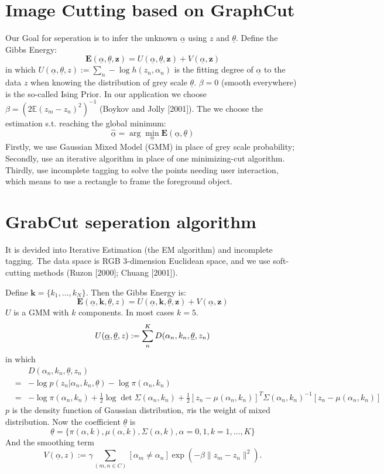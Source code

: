 \documentclass[a4paper, 11pt, nofonts, nocap, fancyhdr, hyperref, UTF8]{ctexart}
\begin{document}
\section{Image Cutting based on GraphCut}
Our Goal for seperation is to infer the unknown $\underline{\alpha}$ using $z$ and $\underline{\theta}$. Define the Gibbs Energy:
$$
\textbf{E}(\underline{\alpha},\underline{\theta},\textbf{z}) = U(\underline{\alpha},\underline{\theta},\textbf{z})+V(\underline{\alpha},\textbf{z})
$$
in which 
$U(\underline{\alpha},\underline{\theta},z) := \sum_n -\log h(z_n, \alpha_n)$
is the fitting degree of $\underline{\alpha}$ to the data $z$ when knowing the distribution of grey scale $\underline{\theta}$.
$\beta = 0$ (smooth everywhere) is the so-called Ising Prior. In our application we choose $\beta = (2\mathbb{E}(z_m-z_n)^2)^{-1}$ (Boykov and Jolly [2001]).
The we choose the estimation s.t. reaching the global minimum:
$$
\hat{\underline{\alpha}} = \arg \min \limits_{\underline{\alpha}} \textbf{E}(\underline{\alpha},\underline{\theta})
$$
Firstly, we use Gaussian Mixed Model (GMM) in place of grey scale probability; Secondly, use an iterative algorithm in place of one minimizing-cut algorithm. Thirdly, use incomplete tagging to solve the points needing user interaction, which means to use a rectangle to frame the foreground object.

\section{GrabCut seperation algorithm}
It is devided into Iterative Estimation (the EM algorithm) and incomplete tagging. The data space is RGB 3-dimension Euclidean space, and we use soft-cutting methods (Ruzon [2000]; Chuang [2001]).

Define $\textbf{k} = \{k_1,\ldots,k_N\}$. Then the Gibbs Energy is:
$$
\textbf{E}(\underline{\alpha},\textbf{k},\underline{\theta},z) = U(\underline{\alpha},\textbf{k},\underline{\theta},\textbf{z})+V(\underline{\alpha},\textbf{z})
$$
$U$ is a GMM with $k$ components. In most cases $k=5$. 
$$
U(\underline{\alpha},\underline{\theta},z) := \sum \limits_n \limits^K D(\alpha_n,k_n,\underline{\theta},z_n) \\
$$
in which
\begin{eqnarray}
&&D(\alpha_n,k_n,\underline{\theta},z_n)\nonumber\\
&=&-\log p(z_n|\alpha_n,k_n,\underline{\theta})-\log\pi(\alpha_n,k_n) \nonumber\\
&=& -\log \pi(\alpha_n,k_n)+\frac{1}{2}\log\det \Sigma(\alpha_n,k_n)+\frac{1}{2}[z_n-\mu(\alpha_n,k_n)]^T\Sigma(\alpha_n,k_n)^{-1}[z_n-\mu(\alpha_n,k_n)]\nonumber
\end{eqnarray}
$p$ is the density function of Gaussian distribution, $\pi$is the weight of mixed distribution. Now the coefficient $\underline{\theta}$ is
$$
\underline{\theta} = \{\pi(\alpha,k), \mu(\alpha,k), \Sigma(\alpha,k), \alpha = 0,1, k = 1,\ldots,K\}
$$
And the smoothing term
$$
V(\underline{\alpha},z) := \gamma \sum_{(m,n \in C)} [\alpha_m \neq \alpha_n]  \exp (-\beta \|z_m - z_n\|^2).
$$
\end{document}

